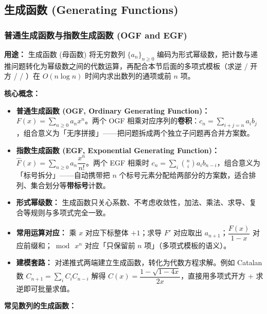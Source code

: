 

\subsection{生成函数 (Generating Functions)}

\subsubsection{普通生成函数与指数生成函数 (OGF and EGF)}

\textbf{用途：}
生成函数 (母函数) 将无穷数列 $\{a_n\}_{n\ge 0}$ 编码为形式幂级数，把计数与递推问题转化为幂级数之间的代数运算，再配合本节后面的多项式模板（求逆 / 开方 /  / ）在 $O(n\log n)$ 时间内求出数列的通项或前 $n$ 项。

\textbf{核心概念：}
\begin{itemize}
    \item \textbf{普通生成函数 (OGF, Ordinary Generating Function)：} $F(x)=\sum_{n\ge 0}a_nx^n$。两个 OGF 相乘对应序列的\textbf{卷积}：$c_n=\sum_{i+j=n}a_ib_j$，组合意义为「无序拼接」——把问题拆成两个独立子问题再合并方案数。
    \item \textbf{指数生成函数 (EGF, Exponential Generating Function)：} $\hat F(x)=\sum_{n\ge 0}a_n\dfrac{x^n}{n!}$。两个 EGF 相乘时 $c_n=\sum_{i}\binom{n}{i}a_ib_{n-i}$，组合意义为「标号拆分」——自动携带把 $n$ 个标号元素分配给两部分的方案数，适合排列、集合划分等\textbf{带标号}计数。
    \item \textbf{形式幂级数：} 生成函数只关心系数、不考虑收敛性，加法、乘法、求导、复合等规则与多项式完全一致。
    \item \textbf{常用运算对应：} 乘 $x$ 对应下标整体 $+1$；求导 $F'$ 对应取出 $a_{n+1}$；$\dfrac{F(x)}{1-x}$ 对应前缀和；$\bmod\ x^n$ 对应「只保留前 $n$ 项」（多项式模板的语义）。
    \item \textbf{建模套路：} 对递推式两端建立生成函数，转化为代数方程求解。例如 Catalan 数 $C_{n+1}=\sum_{i}C_iC_{n-i}$ 解得 $C(x)=\dfrac{1-\sqrt{1-4x}}{2x}$，直接用多项式开方 + 求逆即可批量求值。
\end{itemize}

\textbf{常见数列的生成函数：}

